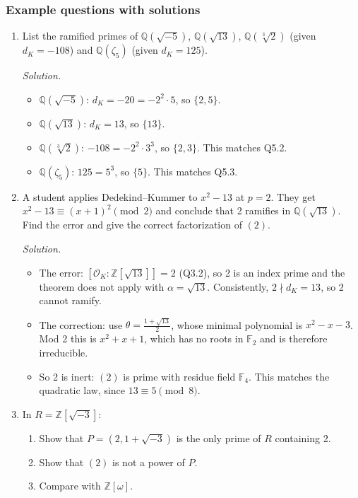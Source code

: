 \documentclass[11pt]{article}
\newcommand{\Z}{\mathbb{Z}}
\newcommand{\Q}{\mathbb{Q}}
\newcommand{\F}{\mathbb{F}}
\newcommand{\OK}{\mathcal{O}_K}
\begin{document}
\subsubsection*{Example questions with solutions}
\begin{enumerate}[label=\textbf{Q6.\arabic*}]
  \item List the ramified primes of $\Q(\sqrt{-5})$, $\Q(\sqrt{13})$, $\Q(\sqrt[3]2)$ (given $d_K=-108$) and $\Q(\zeta_5)$ (given $d_K=125$).

  \textit{Solution.}
  \begin{itemize}
    \item $\Q(\sqrt{-5})$: $d_K=-20=-2^2\cdot5$, so $\{2,5\}$.
    \item $\Q(\sqrt{13})$: $d_K=13$, so $\{13\}$.
    \item $\Q(\sqrt[3]2)$: $-108=-2^2\cdot3^3$, so $\{2,3\}$. This matches Q5.2.
    \item $\Q(\zeta_5)$: $125=5^3$, so $\{5\}$. This matches Q5.3.
  \end{itemize}

  \item A student applies Dedekind--Kummer to $x^2-13$ at $p=2$. They get $x^2-13\equiv(x+1)^2\pmod 2$ and conclude that 2 ramifies in $\Q(\sqrt{13})$. Find the error and give the correct factorization of $(2)$.

  \textit{Solution.}
  \begin{itemize}
    \item The error: $[\OK:\Z[\sqrt{13}]]=2$ (Q3.2), so 2 is an index prime and the theorem does not apply with $\alpha=\sqrt{13}$. Consistently, $2\nmid d_K=13$, so 2 cannot ramify.
    \item The correction: use $\theta=\frac{1+\sqrt{13}}2$, whose minimal polynomial is $x^2-x-3$. Mod 2 this is $x^2+x+1$, which has no roots in $\F_2$ and is therefore irreducible.
    \item So 2 is inert: $(2)$ is prime with residue field $\F_4$. This matches the quadratic law, since $13\equiv5\pmod 8$.
  \end{itemize}

  \item In $R=\Z[\sqrt{-3}]$:
  \begin{enumerate}[label=(\alph*)]
    \item Show that $P=(2,1+\sqrt{-3})$ is the only prime of $R$ containing 2.
    \item Show that $(2)$ is not a power of $P$.
    \item Compare with $\Z[\omega]$.
  \end{enumerate}


\end{enumerate}
\end{document}

